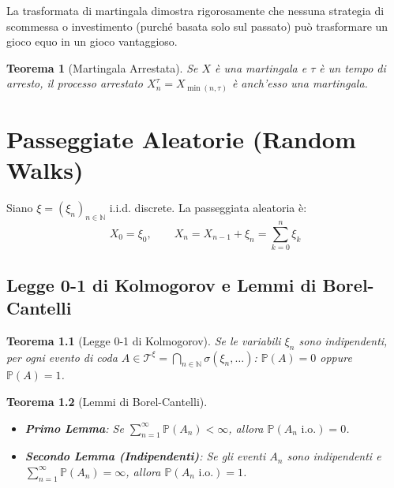 \documentclass[11pt, a4paper]{report}
\theoremstyle{plain}
\newtheorem{theorem}{Teorema}[chapter]
\theoremstyle{definition}
\theoremstyle{remark}
\newcommand{\PP}{\mathbb{P}}
\newcommand{\N}{\mathbb{N}}
\newcommand{\1}{\mathbf{1}}
\begin{document}
\begin{spiegazione}
    La trasformata di martingala dimostra rigorosamente che nessuna strategia di scommessa o investimento (purché basata solo sul passato) può trasformare un gioco equo in un gioco vantaggioso.
\end{spiegazione}

\begin{theorem}[Martingala Arrestata]
Se $X$ è una martingala e $\tau$ è un tempo di arresto, il processo arrestato $X_n^\tau = X_{\min(n, \tau)}$ è anch'esso una martingala.
\end{theorem}

\newpage

\chapter{Passeggiate Aleatorie (Random Walks)}

Siano $\xi = (\xi_n)_{n \in \N}$ i.i.d. discrete. La passeggiata aleatoria è:
\[ X_0 = \xi_0, \qquad X_n = X_{n-1} + \xi_n = \sum_{k=0}^n \xi_k \]

\section{Legge 0-1 di Kolmogorov e Lemmi di Borel-Cantelli}

\begin{theorem}[Legge 0-1 di Kolmogorov]
Se le variabili $\xi_n$ sono indipendenti, per ogni evento di coda $A \in \mathcal{T}^\xi = \bigcap_{n \in \N} \sigma(\xi_n, \dots)$: $\PP(A) = 0$ oppure $\PP(A) = 1$.
\end{theorem}

\begin{theorem}[{Lemmi di Borel-Cantelli}]
\begin{itemize}
    \item \textbf{Primo Lemma}: Se $\sum_{n=1}^\infty \PP(A_n) < \infty$, allora $\PP(A_n \text{ i.o.}) = 0$.
    \item \textbf{Secondo Lemma (Indipendenti)}: Se gli eventi $A_n$ sono indipendenti e $\sum_{n=1}^\infty \PP(A_n) = \infty$, allora $\PP(A_n \text{ i.o.}) = 1$.
\end{itemize}
\end{theorem}
\end{document}
